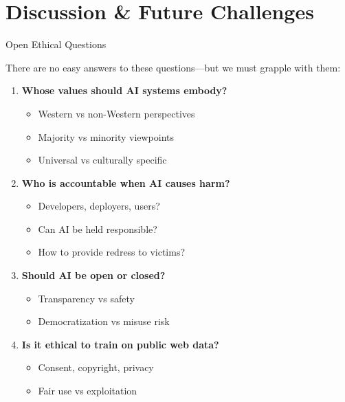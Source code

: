 \documentclass[aspectratio=169]{beamer}
\begin{document}
\section{Discussion \& Future Challenges}

\begin{frame}[shrink=10]{Open Ethical Questions 🤔}
\begin{discussionbox}
There are no easy answers to these questions—but we must grapple with them:
\end{discussionbox}

\vspace{0.5em}

\begin{enumerate}\setlength{\itemsep}{0pt}
    \item \textbf{Whose values should AI systems embody?}
    \begin{itemize}\setlength{\itemsep}{0pt}
        \item Western vs non-Western perspectives
        \item Majority vs minority viewpoints
        \item Universal vs culturally specific
    \end{itemize}

    \item \textbf{Who is accountable when AI causes harm?}
    \begin{itemize}\setlength{\itemsep}{0pt}
        \item Developers, deployers, users?
        \item Can AI be held responsible?
        \item How to provide redress to victims?
    \end{itemize}

    \item \textbf{Should AI be open or closed?}
    \begin{itemize}\setlength{\itemsep}{0pt}
        \item Transparency vs safety
        \item Democratization vs misuse risk
    \end{itemize}

    \item \textbf{Is it ethical to train on public web data?}
    \begin{itemize}\setlength{\itemsep}{0pt}
        \item Consent, copyright, privacy
        \item Fair use vs exploitation
    \end{itemize}


\end{enumerate}
\end{frame}
\end{document}
